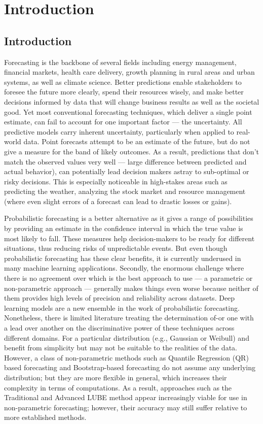 \chapter{Introduction}\label{Guidelines}
\section{Introduction}
Forecasting is the backbone of several fields including energy management, financial markets, health care delivery, growth planning in rural areas and urban systems, as well as climate science. Better predictions enable stakeholders to foresee the future more clearly, spend their resources wisely, and make better decisions informed by data that will change business results as well as the societal good. Yet most conventional forecasting techniques, which deliver a single point estimate, can fail to account for one important factor — the uncertainty.
All predictive models carry inherent uncertainty, particularly when applied to real-world data. Point forecasts attempt to be an estimate of the future, but do not give a measure for the band of likely outcomes. As a result, predictions that don't match the observed values very well — large difference between predicted and actual behavior), can potentially lead decision makers astray to sub-optimal or risky decisions. This is especially noticeable in high-stakes areas such as predicting the weather, analyzing the stock market and resource management (where even slight errors of a forecast can lead to drastic losses or gains).
\par Probabilistic forecasting is a better alternative as it gives a range of possibilities by providing an estimate in the confidence interval in which the true value is most likely to fall. These measures help decision-makers to be ready for different situations, thus reducing risks of unpredictable events. But even though probabilistic forecasting has these clear benefits, it is currently underused in many machine learning applications. Secondly, the enormous challenge where there is no agreement over which is the best approach to use — a parametric or non-parametric approach — generally makes things even worse because neither of them provides high levels of precision and reliability across datasets.
Deep learning models are a new ensemble in the work of probabilistic forecasting. Nonetheless, there is limited literature treating the determination of-or one with a lead over another on the discriminative power of these techniques across different domains. For a particular distribution (e.g., Gaussian or Weibull) and benefit from simplicity but may not be suitable to the realities of the data. However, a class of non-parametric methods such as Quantile Regression (QR) based forecasting and Bootstrap-based forecasting do not assume any underlying distribution; but they are more flexible in general, which increases their complexity in terms of computations. As a result, approaches such as the Traditional and Advanced LUBE method appear increasingly viable for use in non-parametric forecasting; however, their accuracy may still suffer relative to more established methods.

